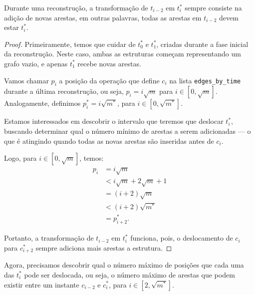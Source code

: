 \begin{theorem}
    \label{teo:adicao-arestas}
    Durante uma reconstrução, a transformação de $t_{i-2}$ em $t_i^*$ sempre consiste na adição de novas arestas, em outras palavras, todas as arestas em $t_{i-2}$ devem estar $t_i^*$.
\end{theorem}
\begin{proof}
    Primeiramente, temos que cuidar de $t_0^*$ e $t_1^*$, criadas durante a fase inicial da reconstrução. Neste caso, ambas as estruturas começam representando um grafo vazio, e apenas $t_1^*$ recebe novas arestas.

    Vamos chamar $p_i$ a posição da operação que define $c_i$ na lista \texttt{edges\_by\_time} durante a última reconstrução, ou seja, $p_i = i \sqrt{m}$ para $i \in [0, \sqrt{m}]$. Analogamente, definimos $p_i^* = i\sqrt{m^*}$, para $i \in [0, \sqrt{m^*}]$.

    Estamos interessados em descobrir o intervalo que teremos que deslocar $t_i^*$, buscando determinar qual o número mínimo de arestas a serem adicionadas --- o que é atingindo quando todas as novas arestas são inseridas antes de $c_i$.

    Logo, para $i \in [0, \sqrt{m}]$, temos:
    \begin{align*}
        p_i & = i \sqrt{m}                 \\
            & < i \sqrt{m} + 2\sqrt{m} + 1 \\
            & = (i+2) \sqrt{m}             \\
            & < (i+2) \sqrt{m^*}           \\
            & = p_{i+2}^*.
    \end{align*}

    Portanto, a transformação de $t_{i-2}$ em $t_i^*$ funciona, pois, o deslocamento de $c_i$ para $c_{i+2}^*$ sempre adiciona mais arestas a estrutura.
\end{proof}

Agora, precisamos descobrir qual o número máximo de posições que cada uma das $t_i^*$ pode ser deslocada, ou seja, o número máximo de arestas que podem existir entre um instante $c_{i-2}$ e $c_i^*$, para $i \in [2,\sqrt{m^*}]$.

